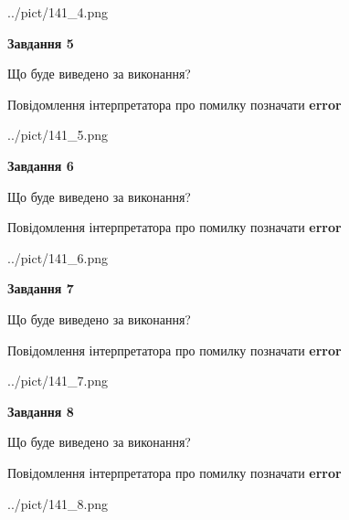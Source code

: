 \documentclass[12pt, ukrainian]{article}
\begin{document}
{\begin{center}
	{../pict/141_4.png}
\end{center}
\newpage

{\begin {center}\textbf{Завдання 5}\end {center}}\par
Що буде виведено за виконання? \par
Повідомлення інтерпретатора про помилку позначати \textbf{error}

\begin{center}
	{../pict/141_5.png}
\end{center}
\newpage

{\begin {center}\textbf{Завдання 6}\end {center}}\par
Що буде виведено за виконання? \par
Повідомлення інтерпретатора про помилку позначати \textbf{error}

\begin{center}
	{../pict/141_6.png}
\end{center}
\newpage

{\begin {center}\textbf{Завдання 7}\end {center}}\par
Що буде виведено за виконання? \par
Повідомлення інтерпретатора про помилку позначати \textbf{error}

\begin{center}
	{../pict/141_7.png}
\end{center}
\newpage

{\begin {center}\textbf{Завдання 8}\end {center}}\par
Що буде виведено за виконання? \par
Повідомлення інтерпретатора про помилку позначати \textbf{error}

\begin{center}
	{../pict/141_8.png}
\end{center}
\newpage

}
\end{document}

